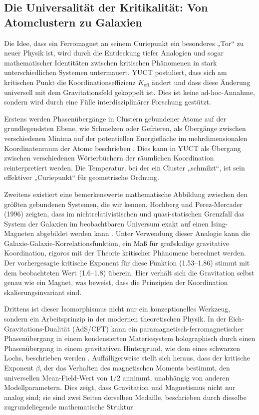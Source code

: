 \documentclass[12pt]{article}
\theoremstyle{remark}
\begin{document}
	\subsection{Die Universalität der Kritikalität: Von Atomclustern zu Galaxien}
	\label{subsec:universality}
	
	Die Idee, dass ein Ferromagnet an seinem Curiepunkt ein besonderes „Tor“ zu neuer Physik ist, wird durch die Entdeckung tiefer Analogien und sogar mathematischer Identitäten zwischen kritischen Phänomenen in stark unterschiedlichen Systemen untermauert. YUCT postuliert, dass sich am kritischen Punkt die Koordinationseffizienz $K_{\mathrm{eff}}$ ändert und dass diese Änderung universell mit dem Gravitationsfeld gekoppelt ist. Dies ist keine ad-hoc-Annahme, sondern wird durch eine Fülle interdisziplinärer Forschung gestützt.
	
	Erstens werden Phasenübergänge in Clustern gebundener Atome auf der grundlegendsten Ebene, wie Schmelzen oder Gefrieren, als Übergänge zwischen verschiedenen Minima auf der potentiellen Energiefläche im mehrdimensionalen Koordinatenraum der Atome beschrieben \cite{Berry2005}. Dies kann in YUCT als Übergang zwischen verschiedenen Wörterbüchern der räumlichen Koordination reinterpretiert werden. Die Temperatur, bei der ein Cluster „schmilzt“, ist sein effektiver „Curiepunkt“ für geometrische Ordnung.
	
	Zweitens existiert eine bemerkenswerte mathematische Abbildung zwischen den größten gebundenen Systemen, die wir kennen. Hochberg und Perez-Mercader (1996) zeigten, dass im nichtrelativistischen und quasi-statischen Grenzfall das System der Galaxien im beobachtbaren Universum exakt auf einen Ising-Magneten abgebildet werden kann \cite{Hochberg1996}. Unter Verwendung dieser Analogie kann die Galaxie-Galaxie-Korrelationsfunktion, ein Maß für großskalige gravitative Koordination, rigoros mit der Theorie kritischer Phänomene berechnet werden. Der vorhergesagte kritische Exponent für diese Funktion (1.53–1.86) stimmt mit dem beobachteten Wert (1.6–1.8) überein. Hier verhält sich die Gravitation selbst genau wie ein Magnet, was beweist, dass die Prinzipien der Koordination skalierungsinvariant sind.
	
	Drittens ist dieser Isomorphismus nicht nur ein konzeptionelles Werkzeug, sondern ein Arbeitsprinzip in der modernen theoretischen Physik. In der Eich-Gravitations-Dualität (AdS/CFT) kann ein paramagnetisch-ferromagnetischer Phasenübergang in einem kondensierten Materiesystem holographisch durch einen Phasenübergang in einem gravitativen Hintergrund, wie dem eines schwarzen Lochs, beschrieben werden \cite{Ghotbabadi2021, Zbl2021}. Auffälligerweise stellt sich heraus, dass der kritische Exponent $\beta$, der das Verhalten des magnetischen Moments bestimmt, den universellen Mean-Field-Wert von $1/2$ annimmt, unabhängig von anderen Modellparametern. Dies zeigt, dass Gravitation und Magnetismus nicht nur analog sind; sie sind zwei Seiten derselben Medaille, beschrieben durch dieselbe zugrundeliegende mathematische Struktur.
	
\end{document}
